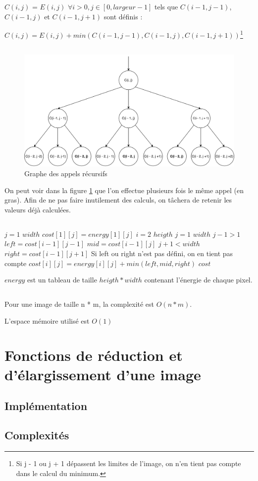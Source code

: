  $C(i, j)$ = $E(i, j)$
\bigbreak
$\forall i > 0, j \in [0, largeur - 1]$ tels que $C(i - 1, j -1)$, $C(i - 1, j)$ et $C(i - 1, j + 1)$ sont définis :

$C(i, j) = E(i, j) + min(C(i - 1, j -1), C(i - 1, j), C(i - 1, j + 1))$\footnote{Si j - 1 ou j + 1 dépassent les limites de l'image, on n'en tient pas compte dans le calcul du minimum.}
\subsection{} %
\begin{figure}[H]
	\centering
	\includegraphics[width=1\linewidth]{cost.pdf}
	\caption{Graphe des appels récursifs}
	\label{cost}
\end{figure}

On peut voir dans la figure \ref{cost} que l'on effectue plusieurs fois le même appel (en gras). Afin de ne pas faire inutilement des calculs, on tâchera de retenir les valeurs déjà calculées.

\subsection{} %
\begin{codebox}
\li \For $j = 1$ \To $width$
\Do
\li 	$cost[1][j] = energy[1][j]$
\End
\li \For $i = 2$ \To $heigth$
\Do 
\li 	\For $j = 1$ \To $width$
 		\Do
\li 		\If $j - 1> 1$
			\Do 
\li 			$left = cost[i - 1][j - 1]$
\End
\li 		$mid = cost[i - 1][j]$
\li 		\If $j + 1< width$
			\Do 
\li 			$right = cost[i - 1][j + 1]$
\End
\li \Comment Si left ou right n'est pas défini, on en tient pas compte
\li 		$cost[i][j] = energy[i][j] + min(left, mid, right)$
	\End
\End
\li \Return $cost$
\end{codebox}
$energy$ est un tableau de taille $heigth * width$ contenant l'énergie de chaque pixel.

\subsection{} %
Pour une image de taille n * m, la complexité est $O(n * m)$.

L'espace mémoire utilisé est $O(1)$

\section{Fonctions de réduction et d'élargissement d'une image} %
\subsection{Implémentation} %
\subsection{Complexités} %

